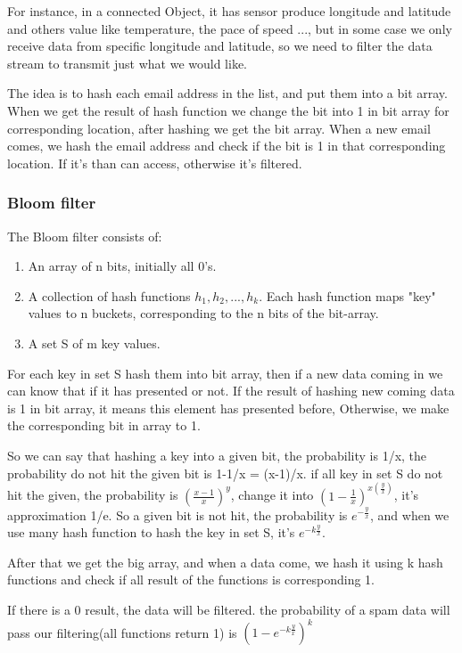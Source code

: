 \documentclass{report}
\begin{document}
For instance, in a connected Object, it has sensor produce longitude and latitude and others value like temperature, the pace of speed ..., but in some case we only receive data from specific longitude and latitude, so we need to filter the data stream to transmit just what we would like.

The idea is to hash each email address in the list, and put them into a bit array. When we get the result of hash function we change the bit into 1 in bit array for corresponding location, after hashing we get the bit array. When a new email comes, we hash the email address and check if the bit is 1 in that corresponding location. If it's than can access, otherwise it's filtered.

\subsubsection{Bloom filter}

The Bloom filter consists of:\cite{leskovec2014mining}
\begin{enumerate}
    \item An array of n bits, initially all 0’s.
    \item A collection of hash functions $h_1, h_2, ... , h_k$. Each hash function maps "key" values to n buckets, corresponding to the n bits of the bit-array.
    \item A set S of m key values.
\end{enumerate}

For each key in set S hash them into bit array, then if a new data coming in we can know that if it has presented or not. If the result of hashing new coming data is 1 in bit array, it means this element has presented before, Otherwise, we make the corresponding bit in array to 1.

So we can say that hashing a key into a given bit, the probability is 1/x, the probability do not hit the given bit is 1-1/x = (x-1)/x.
if all key in set S do not hit the given, the probability is $(\frac{x-1}{x})^y$, change it into $(1-\frac{1}{x})^{x(\frac{y}{x})}$, it's approximation 1/e.
So a given bit is not hit, the probability is $e^{-\frac{y}{x}}$, and when we use many hash function to hash the key in set S, it's $e^{-k\frac{y}{x}}$.

After that we get the big array, and when a data come, we hash it using k hash functions and check if all result of the functions is corresponding 1.

If there is a 0 result, the data will be filtered. the probability of a spam data will pass our filtering(all functions return 1) is $(1-e^{-k\frac{y}{x}})^k$\cite{leskovec2014mining}
\end{document}
